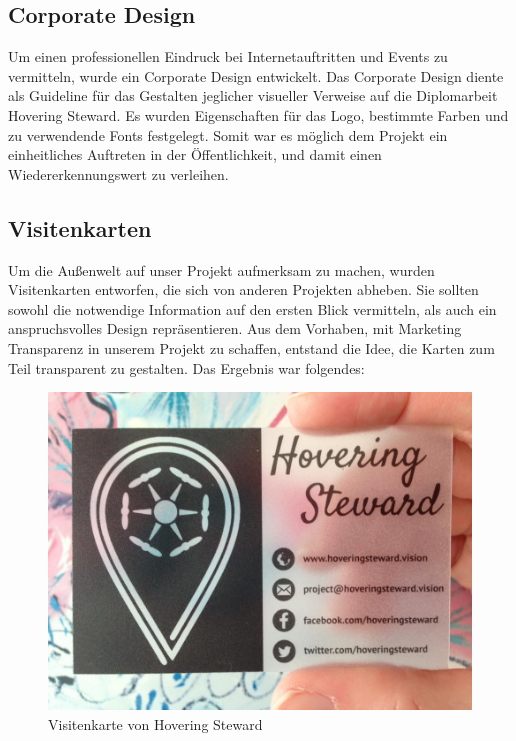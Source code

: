     \subsection*{Corporate Design}
    Um einen professionellen Eindruck bei Internetauftritten und Events zu vermitteln, wurde ein Corporate Design entwickelt.
    Das Corporate Design diente als Guideline für das Gestalten jeglicher visueller Verweise auf die Diplomarbeit Hovering Steward.
    Es wurden Eigenschaften für das Logo, bestimmte Farben und zu verwendende Fonts festgelegt.
    Somit war es möglich dem Projekt ein einheitliches Auftreten in der Öffentlichkeit, und damit einen Wiedererkennungswert zu verleihen.

    \subsection*{Visitenkarten}
    Um die Außenwelt auf unser Projekt aufmerksam zu machen, wurden Visitenkarten entworfen, die sich von anderen Projekten abheben.
    Sie sollten sowohl die notwendige Information auf den ersten Blick vermitteln, als auch ein anspruchsvolles Design repräsentieren. Aus dem Vorhaben,
    mit Marketing Transparenz in unserem Projekt zu schaffen, entstand die Idee, die Karten zum Teil transparent zu gestalten.
    Das Ergebnis war folgendes:

    \begin{figure}[H]
      \begin{centering}
      \includegraphics[width = 1\textwidth]{Bilder/visitenkarte.jpg}
      \par\end{centering}
      \caption{Visitenkarte von Hovering Steward}
      \label{visitenkarte}
    \end{figure}

